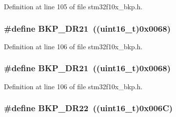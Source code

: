 Definition at line 105 of file stm32f10x\+\_\+bkp.\+h.

\subsubsection[{\texorpdfstring{B\+K\+P\+\_\+\+D\+R21}{BKP_DR21}}]{\setlength{\rightskip}{0pt plus 5cm}\#define B\+K\+P\+\_\+\+D\+R21~(({\bf uint16\+\_\+t})0x0068)}\hypertarget{group___data___backup___register_gabb044653f8eda603075107603949d84a}{}\label{group___data___backup___register_gabb044653f8eda603075107603949d84a}


Definition at line 106 of file stm32f10x\+\_\+bkp.\+h.

\subsubsection[{\texorpdfstring{B\+K\+P\+\_\+\+D\+R21}{BKP_DR21}}]{\setlength{\rightskip}{0pt plus 5cm}\#define B\+K\+P\+\_\+\+D\+R21~(({\bf uint16\+\_\+t})0x0068)}\hypertarget{group___data___backup___register_gabb044653f8eda603075107603949d84a}{}\label{group___data___backup___register_gabb044653f8eda603075107603949d84a}


Definition at line 106 of file stm32f10x\+\_\+bkp.\+h.

\subsubsection[{\texorpdfstring{B\+K\+P\+\_\+\+D\+R22}{BKP_DR22}}]{\setlength{\rightskip}{0pt plus 5cm}\#define B\+K\+P\+\_\+\+D\+R22~(({\bf uint16\+\_\+t})0x006\+C)}\hypertarget{group___data___backup___register_gab78636475b284bbaeb819d510cfcc397}{}\label{group___data___backup___register_gab78636475b284bbaeb819d510cfcc397}


